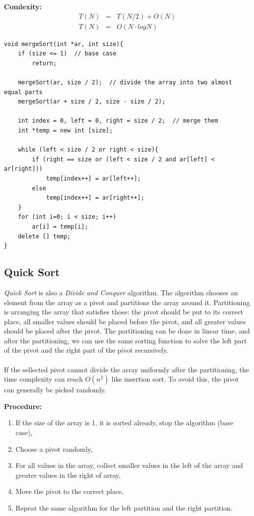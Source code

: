 \documentclass[12pt]{article}
\begin{document}
\textbf{Comlexity: }
\begin{eqnarray*}
	T(N) &=& T(N / 2) + O(N) \\
	T(N) &=& O(N \cdot logN)
\end{eqnarray*}

\begin{verbatim}
void mergeSort(int *ar, int size){
    if (size <= 1)  // base case
        return;
	
    mergeSort(ar, size / 2);  // divide the array into two almost equal parts
    mergeSort(ar + size / 2, size - size / 2);
	
    int index = 0, left = 0, right = size / 2;  // merge them 
    int *temp = new int [size];
	
    while (left < size / 2 or right < size){
        if (right == size or (left < size / 2 and ar[left] < ar[right]))
            temp[index++] = ar[left++];
        else 
            temp[index++] = ar[right++];
    }
    for (int i=0; i < size; i++)
        ar[i] = temp[i];
    delete [] temp;
}		
\end{verbatim}

\cleardoublepage

		\subsection{Quick Sort}
		
\textit{Quick Sort} is also a \textit{Divide and Conquer} algorithm. The algorithm chooses an element from the array as a pivot and partitions the array around it. Partitioning is arranging the array that satisfies those: the pivot should be put to its correct place, all smaller values should be placed before the pivot, and all greater values should be placed after the pivot. The partitioning can be done in linear time, and after the partitioning, we can use the same sorting function to solve the left part of the pivot and the right part of the pivot recursively. \\ \\
If the sellected pivot cannot divide the array uniformly after the partitioning, the time complexity can reach $O(n ^ 2)$ like insertion sort. To avoid this, the pivot can generally be picked randomly.

\textbf{Procedure: }
\begin{enumerate}
	\item If the size of the array is 1, it is sorted already, stop the algorithm (base case),
	\item Choose a pivot randomly,
	\item For all values in the array, collect smaller values in the left of the array and greater values in the right of array,
	\item Move the pivot to the correct place,
	\item Repeat the same algorithm for the left partition and the right partition.
\end{enumerate}	
\end{document}
